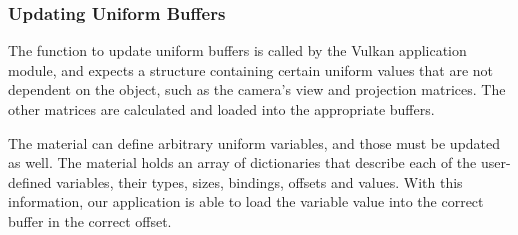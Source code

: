 \subsubsection{Updating Uniform Buffers}
The function to update uniform buffers is called by the Vulkan application module, and expects a structure containing certain uniform values that are not dependent on the object, such as the camera's view and projection matrices. The other matrices are calculated and loaded into the appropriate buffers.

The material can define arbitrary uniform variables, and those must be updated as well. The material holds an array of dictionaries that describe each of the user-defined variables, their types, sizes, bindings, offsets and values. With this information, our application is able to load the variable value into the correct buffer in the correct offset.
